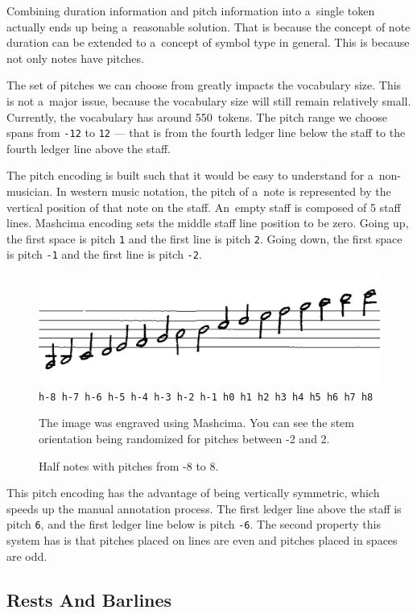 Combining duration information and pitch information into a~single token actually ends up being a~reasonable solution. That is because the concept of note duration can be extended to a~concept of symbol type in general. This is because not only notes have pitches.

The set of pitches we can choose from greatly impacts the vocabulary size. This is not a~major issue, because the vocabulary size will still remain relatively small. Currently, the vocabulary has around 550~tokens. The pitch range we choose spans from \texttt{-12} to \texttt{12} --- that is from the fourth ledger line below the staff to the fourth ledger line above the staff.

The pitch encoding is built such that it would be easy to understand for a~non-musician. In western music notation, the pitch of a~note is represented by the vertical position of that note on the staff. An~empty staff is composed of 5 staff lines. Mashcima encoding sets the middle staff line position to be zero. Going up, the first space is pitch \texttt{1} and the first line is pitch \texttt{2}. Going down, the first space is pitch \texttt{-1} and the first line is pitch \texttt{-2}.

\begin{figure}[h]
    \centering
    \includegraphics[width=120mm]{../img/rising-half-notes}
    \verb`h-8 h-7 h-6 h-5 h-4 h-3 h-2 h-1 h0 h1 h2 h3 h4 h5 h6 h7 h8`
    \caption{Half notes with pitches from -8 to 8.}
    \label{fig4:RisingHalfNotes}
    \medskip
    \small
    The image was engraved using Mashcima. You can see the stem orientation being randomized for pitches between -2 and 2.
\end{figure}

This pitch encoding has the advantage of being vertically symmetric, which speeds up the manual annotation process. The first ledger line above the staff is pitch \texttt{6}, and the first ledger line below is pitch \texttt{-6}. The second property this system has is that pitches placed on lines are even and pitches placed in spaces are odd.


\subsection{Rests And Barlines}

